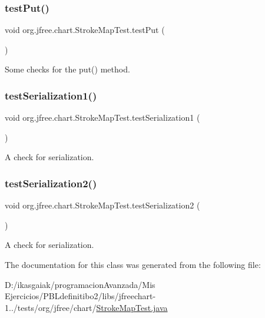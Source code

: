 \subsubsection{\texorpdfstring{test\+Put()}{testPut()}}
{\footnotesize\ttfamily void org.\+jfree.\+chart.\+Stroke\+Map\+Test.\+test\+Put (\begin{DoxyParamCaption}{ }\end{DoxyParamCaption})}

Some checks for the put() method. \mbox{\label{classorg_1_1jfree_1_1chart_1_1_stroke_map_test_afa31ab4ef78c1da89b80bd77706af8a2}} 
\subsubsection{\texorpdfstring{test\+Serialization1()}{testSerialization1()}}
{\footnotesize\ttfamily void org.\+jfree.\+chart.\+Stroke\+Map\+Test.\+test\+Serialization1 (\begin{DoxyParamCaption}{ }\end{DoxyParamCaption})}

A check for serialization. \mbox{\label{classorg_1_1jfree_1_1chart_1_1_stroke_map_test_add718e9d10ab4ce58c14e76f0fc72a56}} 
\subsubsection{\texorpdfstring{test\+Serialization2()}{testSerialization2()}}
{\footnotesize\ttfamily void org.\+jfree.\+chart.\+Stroke\+Map\+Test.\+test\+Serialization2 (\begin{DoxyParamCaption}{ }\end{DoxyParamCaption})}

A check for serialization. 

The documentation for this class was generated from the following file\+:\begin{DoxyCompactItemize}
\item 
D\+:/ikasgaiak/programacion\+Avanzada/\+Mis Ejercicios/\+P\+B\+Ldefinitibo2/libs/jfreechart-\/1../tests/org/jfree/chart/\mbox{\hyperlink{_stroke_map_test_8java}{Stroke\+Map\+Test.\+java}}\end{DoxyCompactItemize}
